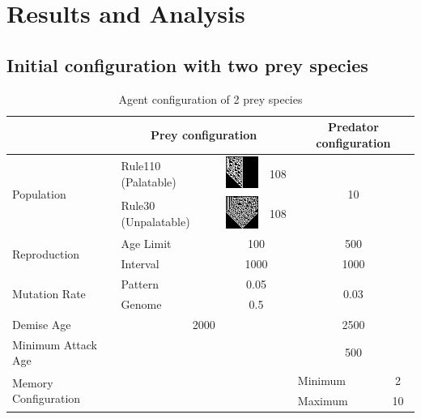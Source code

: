 \chapter{Results and Analysis}

\section{Initial configuration with two prey species}

\begin{table}
\centering
\caption{Agent configuration of 2 prey species}
\label{tab:config-table-2-prey}
\begin{tabular}{|l|l|c|c|l|c|}
  \hline
   														&\multicolumn{3}{|c|}{Prey configuration} 																	
   														& \multicolumn{2}{|c|}{Predator configuration} \\ \hline
  \multirow{2}{*}{Population} & Rule110 (Palatable) & \includegraphics[scale=0.50]{images/CARule110} & 108 
  														& \multicolumn{2}{|c|}{\multirow{2}{*}{10}} \\ \cline{2-4}
  					 									& Rule30 (Unpalatable)& \includegraphics[scale=0.50]{images/CARule30}  & 108 
  					 									& \multicolumn{2}{|c|}{}\\ \hline
  \multirow{2}{*}{Reproduction} & Age Limit & \multicolumn{2}{|c|}{100}  & \multicolumn{2}{|c|}{500} \\ \cline{2-6}
  						 									& Interval  & \multicolumn{2}{|c|}{1000} & \multicolumn{2}{|c|}{1000} \\ \hline
  \multirow{2}{*}{Mutation Rate} & Pattern   & \multicolumn{2}{|c|}{0.05} & \multicolumn{2}{|c|}{\multirow{2}{*}{0.03}} \\ \cline{2-4}
  						 									 & Genome    & \multicolumn{2}{|c|}{0.5}  & \multicolumn{2}{|c|}{} \\ \hline
  Demise Age	 									 & \multicolumn{3}{|c|}{2000}							& \multicolumn{2}{|c|}{2500} \\ \hline
  Minimum Attack Age						 & \multicolumn{3}{|c|}{} 						    & \multicolumn{2}{|c|}{500} \\ \hline
  \multirow{2}{*}{Memory Configuration} & \multicolumn{3}{|c|}{} 					& Minimum & 2 \\ \cline{5-6}
   																			& \multicolumn{3}{|c|}{} 					& Maximum & 10 \\ \hline  
\end{tabular}
\end{table}

